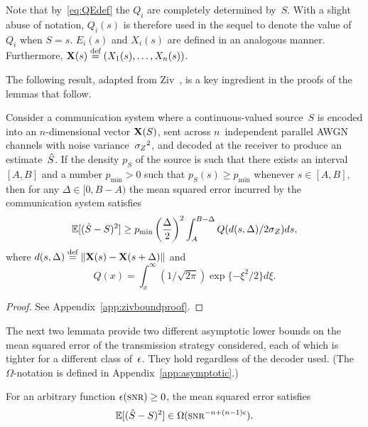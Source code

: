 \begin{remark}
  \label{rem:functionnotation}
  Note that by~\eqref{eq:QEdef} the $Q_i$ are completely determined by~$S$.
  With a slight abuse of notation, $Q_i(s)$ is therefore used in the sequel to
  denote the value of~$Q_i$ when $S = s$. $E_i(s)$ and $X_i(s)$ are defined in
  an analogous manner. Furthermore, $\mathbf{X}(s) \stackrel{\text{def}}{=} (X_1(s), \dots, X_n(s))$.
\end{remark}

The following result, adapted from Ziv~\cite{Ziv1970}, is a key ingredient in
the proofs of the lemmas that follow.

\begin{lemma}
  \label{lem:zivbound}
  Consider a communication system where a con\-tin\-u\-ous-valued source~$S$ is
  encoded into an $n$-dimensional vector $\mathbf{X}(S)$, sent across $n$~independent
  parallel AWGN channels with noise variance~${{\sigma_Z}^2}$, and decoded at the receiver
  to produce an estimate~${\hat{S}}$.  If the density $p_S$ of the source is such that
  there exists an interval $[A,B]$ and a number $p_{\min} > 0$ such that $p_S(s)
  \ge p_{\min}$ whenever $s \in [A,B]$, then for any $\Delta \in [0,B-A)$ the
  mean squared error incurred by the communication system satisfies
  \begin{equation}
    \label{eq:zivbound}
    \mathbb{E}[({\hat{S}} - S)^2] \ge p_{\min} \left(\frac{\Delta}{2} \right)^2 
    \int_A^{B-\Delta} Q(d(s, \Delta) / 2 {\sigma_Z}) ds,
  \end{equation}
  where $d(s, \Delta) \stackrel{\text{def}}{=} \|\mathbf{X}(s) - \mathbf{X}(s+\Delta)\|$ and 
  \[Q(x) = \int_x^{\infty} (1/\sqrt{2\pi}) \exp\{-\xi^2/2\} d\xi.\]
\end{lemma}

\begin{proof}
  See Appendix~\ref{app:zivboundproof}.
\end{proof}

The next two lemmata provide two different asymptotic lower bounds on the
mean squared error of the transmission strategy considered, each of which is
tighter for a different class of~$\epsilon$. They hold regardless of the decoder used.
(The $\Omega$-notation is defined in Appendix~\ref{app:asymptotic}.)

\begin{lemma}
  \label{lem:lowerbound1}
  For an arbitrary function $\e(\snr) \ge 0$, the mean squared error satisfies
  \begin{equation*}
    \mse \in \Omega(\snr^{-n + (n-1)\e}).
  \end{equation*}
\end{lemma}

